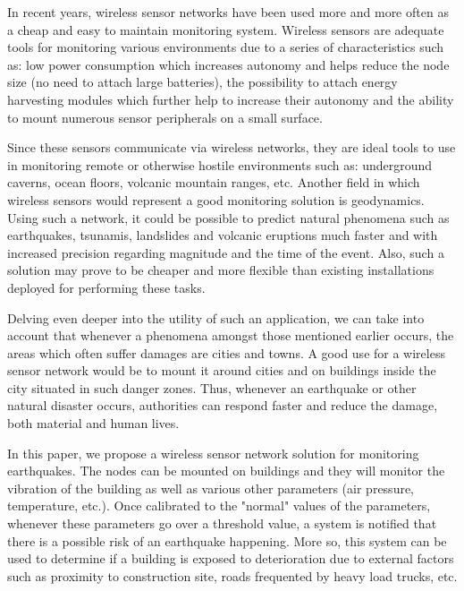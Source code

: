 In recent years, wireless sensor networks have been used more and more often as a cheap and easy to maintain monitoring system.
Wireless sensors are adequate tools for monitoring various environments due to a series of characteristics such as: low power 
consumption which increases autonomy and helps reduce the node size (no need to attach large batteries), the possibility to 
attach energy harvesting modules which further help to increase their autonomy and the ability to mount numerous sensor peripherals 
on a small surface.

Since these sensors communicate via wireless networks, they are ideal tools to use in monitoring remote or otherwise hostile 
environments such as: underground caverns, ocean floors, volcanic mountain ranges, etc. Another field in which wireless sensors 
would represent a good monitoring solution is geodynamics. Using such a network, it could be
possible to predict natural phenomena such 
as earthquakes, tsunamis, landslides and volcanic eruptions much faster and with increased precision regarding magnitude and the 
time of the event. Also, such a solution may prove to be cheaper and more flexible than existing installations deployed for performing 
these tasks.

Delving even deeper into the utility of such an application, we can take into account that whenever a phenomena amongst those mentioned 
earlier occurs, the areas which often suffer damages are cities and towns. A good use for a wireless sensor network would be to mount it 
around cities and on buildings inside the city situated in such danger zones. Thus, whenever an earthquake or other natural disaster occurs, 
authorities can respond faster and reduce the damage, both material and human lives.

In this paper, we propose a wireless sensor network solution for monitoring earthquakes. The nodes can be mounted on buildings and 
they will monitor the vibration of the building as well as various other parameters (air pressure, temperature, etc.). Once calibrated 
to the "normal" values of the parameters, whenever these parameters go over a threshold value, a system is notified that there is a possible 
risk of an earthquake happening. More so, this system can be used to determine if a building is
exposed to deterioration due to external factors such as proximity 
to construction site, roads frequented by heavy load trucks, etc.
